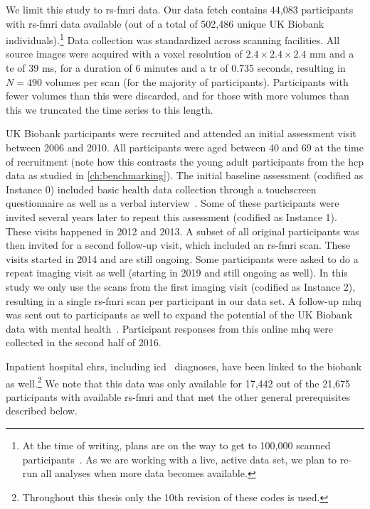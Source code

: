 We limit this study to \gls{rs-fmri} data.
Our data fetch contains 44,083 participants with \gls{rs-fmri} data available (out of a total of 502,486 unique UK Biobank individuals).\footnote{At the time of writing, plans are on the way to get to 100,000 scanned participants~\parencite{Littlejohns2020}. As we are working with a live, active data set, we plan to re-run all analyses when more data becomes available.}
Data collection was standardized across scanning facilities.
All source images were acquired with a voxel resolution of $2.4 \times 2.4 \times 2.4$ mm and a \gls{te} of 39 ms, for a duration of 6 minutes and a \gls{tr} of 0.735 seconds, resulting in $N = 490$ volumes per scan (for the majority of participants).
Participants with fewer volumes than this were discarded, and for those with more volumes than this we truncated the time series to this length.

UK Biobank participants were recruited and attended an initial assessment visit between 2006 and 2010.
All participants were aged between 40 and 69 at the time of recruitment (note how this contrasts the young adult participants from the \gls{hcp} data as studied in \cref{ch:benchmarking}).
The initial baseline assessment (codified as Instance 0) included basic health data collection through a touchscreen questionnaire as well as a verbal interview~\parencite{Bycroft2018}.
Some of these participants were invited several years later to repeat this assessment (codified as Instance 1).
These visits happened in 2012 and 2013.
A subset of all original participants was then invited for a second follow-up visit, which included an \gls{rs-fmri} scan.
These visits started in 2014 and are still ongoing.
Some participants were asked to do a repeat imaging visit as well (starting in 2019 and still ongoing as well).
In this study we only use the scans from the first imaging visit (codified as Instance 2), resulting in a single \gls{rs-fmri} scan per participant in our data set.
A follow-up \gls{mhq} was sent out to participants as well to expand the potential of the UK Biobank data with mental health~\parencite{Davis2020, Glanville2021}.
Participant responses from this online \gls{mhq} were collected in the second half of 2016.

Inpatient hospital \glspl{ehr}, including \gls{icd}~\parencite{WHO1992} diagnoses, have been linked to the biobank as well.\footnote{Throughout this thesis only the 10th revision of these codes is used.}
We note that this data was only available for 17,442 out of the 21,675 participants with available \gls{rs-fmri} and that met the other general prerequisites described below.


